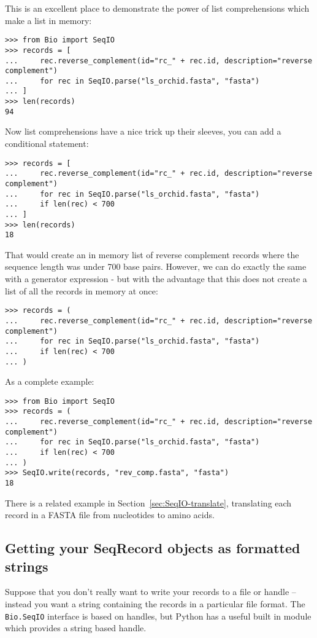 This is an excellent place to demonstrate the power of list comprehensions which make a list in memory:

\begin{verbatim}
>>> from Bio import SeqIO
>>> records = [
...     rec.reverse_complement(id="rc_" + rec.id, description="reverse complement")
...     for rec in SeqIO.parse("ls_orchid.fasta", "fasta")
... ]
>>> len(records)
94
\end{verbatim}

\noindent Now list comprehensions have a nice trick up their sleeves, you can add a conditional statement:

\begin{verbatim}
>>> records = [
...     rec.reverse_complement(id="rc_" + rec.id, description="reverse complement")
...     for rec in SeqIO.parse("ls_orchid.fasta", "fasta")
...     if len(rec) < 700
... ]
>>> len(records)
18
\end{verbatim}

That would create an in memory list of reverse complement records where the sequence length was under 700 base pairs. However, we can do exactly the same with a generator expression - but with the advantage that this does not create a list of all the records in memory at once:

\begin{verbatim}
>>> records = (
...     rec.reverse_complement(id="rc_" + rec.id, description="reverse complement")
...     for rec in SeqIO.parse("ls_orchid.fasta", "fasta")
...     if len(rec) < 700
... )
\end{verbatim}

As a complete example:

\begin{verbatim}
>>> from Bio import SeqIO
>>> records = (
...     rec.reverse_complement(id="rc_" + rec.id, description="reverse complement")
...     for rec in SeqIO.parse("ls_orchid.fasta", "fasta")
...     if len(rec) < 700
... )
>>> SeqIO.write(records, "rev_comp.fasta", "fasta")
18
\end{verbatim}

There is a related example in Section~\ref{sec:SeqIO-translate}, translating each
record in a FASTA file from nucleotides to amino acids.

\subsection{Getting your SeqRecord objects as formatted strings}
\label{sec:Bio.SeqIO-and-StringIO}
Suppose that you don't really want to write your records to a file or handle -- instead you want a string containing the records in a particular file format.  The \verb|Bio.SeqIO| interface is based on handles, but Python has a useful built in module which provides a string based handle.

